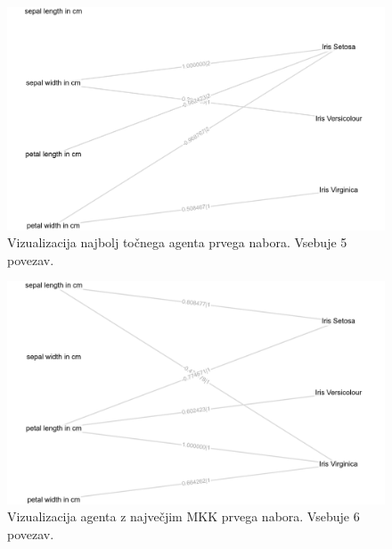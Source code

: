 \begin{figure}[H]
    \begin{center}
        \includegraphics[width=13cm]{iris/1/acc_g}
    \end{center}
    \caption{Vizualizacija najbolj točnega agenta prvega nabora. Vsebuje 5 povezav.}
    \label{fig:iris_acc_1_g}
\end{figure}

\begin{figure}[H]
    \begin{center}
        \includegraphics[width=13cm]{iris/1/mcc_g}
    \end{center}
    \caption{Vizualizacija agenta z največjim MKK prvega nabora. Vsebuje 6 povezav.}
    \label{fig:iris_mcc_1_g}
\end{figure}

